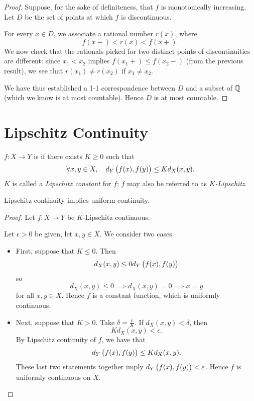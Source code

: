 \begin{proof}
Suppose, for the sake of definiteness, that $f$ is monotonically increasing. Let $D$ be the set of points at which $f$ is discontinuous.

For every $x\in D$, we associate a rational number $r(x)$, where
\[f(x-)<r(x)<f(x+).\]
We now check that the rationals picked for two distinct points of discontinuities are different: 
since $x_1<x_2$ implies $f(x_1+)\le f(x_2-)$ (from the previous result), we see that $r(x_1)\neq r(x_2)$ if $x_1\neq x_2$.

We have thus established a 1-1 correspondence between $D$ and a subset of $\mathbb Q$ (which we know is at most countable). Hence $D$ is at most countable.
\end{proof}
\pagebreak

\section{Lipschitz Continuity}
\begin{definition}
$f:X\to Y$ is  if there exists $K\ge0$ such that
\[\forall x,y\in X,\quad d_Y\left(f(x),f(y)\right)\le K d_X(x,y).\]
$K$ is called a \emph{Lipschitz constant} for $f$; $f$ may also be referred to as \emph{$K$-Lipschitz}.
\end{definition}

\begin{lemma}
Lipschitz continuity implies uniform continuity.
\end{lemma}

\begin{proof}
Let $f:X\to Y$ be $K$-Lipschitz continuous.

Let $\epsilon>0$ be given, let $x,y\in X$. We consider two cases.
\begin{itemize}
\item First, suppose that $K\le0$. Then
\[d_X(x,y)\le 0d_Y\left(f(x),f(y)\right)\]
so
\[d_X(x,y)\le0 \implies d_X(x,y)=0\implies x=y\]
for all $x,y\in X$. Hence $f$ is a constant function, which is uniformly continuous.

\item Next, suppose that $K>0$. Take $\delta=\frac{\epsilon}{K}$. If $d_X(x,y)<\delta$, then
\[Kd_X(x,y)<\epsilon.\]
By Lipschitz continuity of $f$, we have that
\[d_Y\left(f(x),f(y)\right)\le Kd_X(x,y).\]
These last two statements together imply $d_Y\left(f(x),f(y)\right)<\varepsilon$. Hence $f$ is uniformly continuous on $X$.
\end{itemize}
\end{proof}

